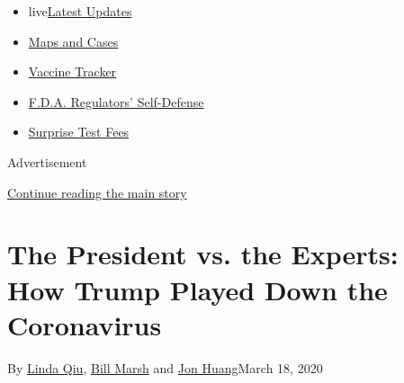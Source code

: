 \begin{itemize}
\tightlist
\item
  live\href{https://www.nytimes3xbfgragh.onion/2020/09/11/world/covid-19-coronavirus.html?name=styln-coronavirus-national\&region=TOP_BANNER\&block=storyline_menu_recirc\&action=click\&pgtype=Interactive\&impression_id=a5a67831-f4c0-11ea-914c-697b59664264\&variant=undefined}{Latest
  Updates}
\item
  \href{https://www.nytimes3xbfgragh.onion/interactive/2020/us/coronavirus-us-cases.html?name=styln-coronavirus-national\&region=TOP_BANNER\&block=storyline_menu_recirc\&action=click\&pgtype=Interactive\&impression_id=a5a67832-f4c0-11ea-914c-697b59664264\&variant=undefined}{Maps
  and Cases}
\item
  \href{https://www.nytimes3xbfgragh.onion/interactive/2020/science/coronavirus-vaccine-tracker.html?name=styln-coronavirus-national\&region=TOP_BANNER\&block=storyline_menu_recirc\&action=click\&pgtype=Interactive\&impression_id=a5a67833-f4c0-11ea-914c-697b59664264\&variant=undefined}{Vaccine
  Tracker}
\item
  \href{https://www.nytimes3xbfgragh.onion/2020/09/10/us/politics/fda-coronavirus-vaccine.html?name=styln-coronavirus-national\&region=TOP_BANNER\&block=storyline_menu_recirc\&action=click\&pgtype=Interactive\&impression_id=a5a69f40-f4c0-11ea-914c-697b59664264\&variant=undefined}{F.D.A.
  Regulators' Self-Defense}
\item
  \href{https://www.nytimes3xbfgragh.onion/2020/09/09/upshot/coronavirus-surprise-test-fees.html?name=styln-coronavirus-national\&region=TOP_BANNER\&block=storyline_menu_recirc\&action=click\&pgtype=Interactive\&impression_id=a5a69f41-f4c0-11ea-914c-697b59664264\&variant=undefined}{Surprise
  Test Fees}
\end{itemize}

Advertisement

\protect\hyperlink{after-top}{Continue reading the main story}

\hypertarget{the-president-vs-the-experts-how-trump-played-down-the-coronavirus}{%
\section{The President vs. the Experts: How Trump Played Down the
Coronavirus}\label{the-president-vs-the-experts-how-trump-played-down-the-coronavirus}}

By \href{https://www.nytimes3xbfgragh.onion/by/linda-qiu}{Linda Qiu},
\href{https://www.nytimes3xbfgragh.onion/by/bill-marsh}{Bill Marsh} and
\href{https://www.nytimes3xbfgragh.onion/by/jon-huang}{Jon Huang}March
18, 2020

